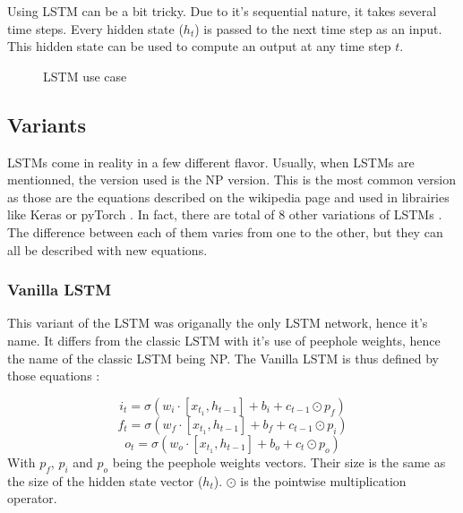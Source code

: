 Using \ac{LSTM} can be a bit tricky. Due to it's sequential nature, it takes several time steps. Every hidden state ($h_t$) is passed to the next time step as an input. This hidden state can be used to compute an output at any time step $t$.

\begin{figure}[H]
  \centering
  
  \caption{LSTM use case}
  \label{fig:lstmUse}
\end{figure}

\subsection{Variants}

\acp{LSTM} come in reality in a few different flavor. Usually, when \acp{LSTM} are mentionned, the version used is the \ac{NP} version. This is the most common version as those are the equations described on the wikipedia page \cite{wikiLSTM} and used in librairies like Keras \cite{Keras} or pyTorch \cite{PyTorch}. In fact, there are total of 8 other variations of \acp{LSTM} \cite{nbLSTM}.
The difference between each of them varies from one to the other, but they can all be described with new equations.

\subsubsection{Vanilla \ac{LSTM}}
This variant of the \ac{LSTM} was origanally the only \ac{LSTM} network, hence it's name. It differs from the classic \ac{LSTM} with it's use of peephole weights, hence the name of the classic \ac{LSTM} being \acl{NP}. The Vanilla \ac{LSTM} is thus defined by those equations \cite{vanillaLSTM, nbLSTM} :

\begin{equation}\label{eq:inputGVanilla}
  i_t=\sigma (w_i\cdot[x_{t_1},h_{t-1}] + b_i+c_{t-1}\odot p_f)
\end{equation}
\begin{equation}\label{eq:forgetGVanilla}
  f_t=\sigma (w_f\cdot[x_{t_1},h_{t-1}] + b_f+c_{t-1}\odot p_i)
\end{equation}
\begin{equation}\label{eq:ouputGVanilla}
  o_t=\sigma (w_o\cdot[x_{t_1},h_{t-1}] + b_o+c_{t}\odot p_o)
\end{equation}
With $p_f$, $p_i$ and $p_o$ being the peephole weights vectors. Their size is the same as the size of the hidden state vector ($h_t$). $\odot$ is the pointwise multiplication operator.

